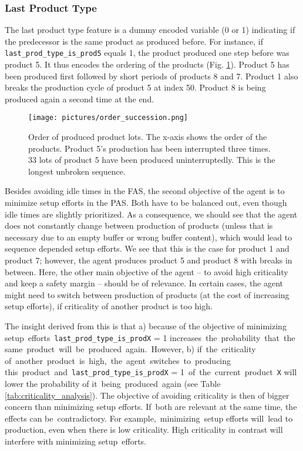 \subsubsection{Last Product Type}
The last product type feature is a dummy encoded variable (0 or 1) indicating if the predecessor is the same product as produced before. For instance, if \texttt{last\_prod\_type\_is\_prod5} equals 1, the product produced one step before was product 5. It thus encodes the ordering of the products (Fig. \ref{fig:order}). Product 5 has been produced first followed by short periods of products 8 and 7. Product 1 also breaks the production cycle of product 5 at index 50. Product 8 is being produced again a second time at the end.


\begin{figure}[H]
    \centering
    \texttt{[image: pictures/order\_succession.png]}
    \caption{Order of produced product lots. The x-axis shows the order of the products. Product 5's production has been interrupted three times. 33 lots of product 5 have been produced uninterruptedly. This is the longest unbroken sequence.}
    \label{fig:order}
\end{figure}

Besides avoiding idle times in the FAS, the second objective of the agent is to minimize setup efforts in the PAS. Both have to be balanced out, even though idle times are slightly prioritized. As a consequence, we should see that the agent does not constantly change between production of products (unless that is necessary due to an empty buffer or wrong buffer content), which would lead to sequence depended setup efforts.
We see that this is the case for product 1 and product 7; however, the agent produces product 5 and product 8 with breaks in between. Here, the other main objective of the agent – to avoid high criticality and keep a safety margin – should be of relevance. In certain cases, the agent might need to switch between production of products (at the cost of increasing setup efforts), if criticality of another product is too high.

The insight derived from this is that a) because of the objective of minimizing setup efforts \texttt{last\_prod\_type\_is\_prodX} = 1 increases the probability that the same product will be produced again. However, b) if the criticality of another product is high, the agent switches to producing this product and \texttt{last\_prod\_type\_is\_prodX} = 1 of the current product \texttt{X} will lower the probability of it being produced again (see Table \ref{tab:criticality_analysis}). The objective of avoiding criticality is then of bigger concern than minimizing setup efforts.
If both are relevant at the same time, the effects can be contradictory. For example, minimizing setup efforts will lead to production, even when there is low criticality. High criticality in contrast will interfere with minimizing setup efforts.


